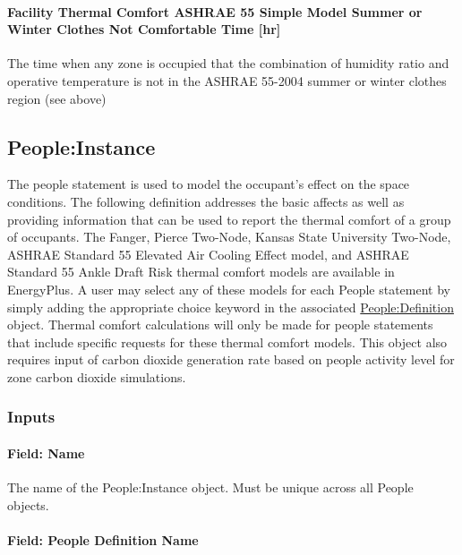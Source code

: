 \paragraph{Facility Thermal Comfort ASHRAE 55 Simple Model Summer or Winter Clothes Not Comfortable Time {[}hr{]}}\label{facility-thermal-comfort-ashrae-55-simple-model-summer-or-winter-clothes-not-comfortable-time-hr}

The time when any zone is occupied that the combination of humidity ratio and operative temperature is not in the ASHRAE 55-2004 summer or winter clothes region (see above)


\subsection{People:Instance}\label{peopleinstance}

The people statement is used to model the occupant's effect on the space conditions. The following definition addresses the basic affects as well as providing information that can be used to report the thermal comfort of a group of occupants. The Fanger, Pierce Two-Node, Kansas State University Two-Node, ASHRAE Standard 55 Elevated Air Cooling Effect model, and ASHRAE Standard 55 Ankle Draft Risk thermal comfort models are available in EnergyPlus. A user may select any of these models for each People statement by simply adding the appropriate choice keyword in the associated \hyperref[peopledefinition]{People:Definition} object. Thermal comfort calculations will only be made for people statements that include specific requests for these thermal comfort models. This object also requires input of carbon dioxide generation rate based on people activity level for zone carbon dioxide simulations.

\subsubsection{Inputs}\label{inputs-025-people-instance}

\paragraph{Field: Name}\label{field-name-024-people-instance}

The name of the People:Instance object. Must be unique across all People objects.

\paragraph{Field: People Definition Name}\label{field-people-definition-name}

